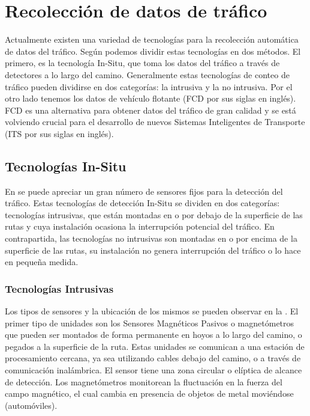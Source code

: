 \chapter{Recolección de datos de tráfico}
\label{cap:3}

Actualmente existen una variedad de tecnologías para la recolección automática de datos del tráfico. Según \cite{mimbela2003summary} podemos dividir estas tecnologías en dos métodos. El primero, es la tecnología In-Situ, que toma los datos del tráfico a través de detectores a lo largo del camino. Generalmente estas tecnologías de conteo de tráfico pueden dividirse en dos categorías: la intrusiva y la no intrusiva. Por el otro lado tenemos los datos de vehículo flotante (FCD por sus siglas en inglés). FCD es una alternativa para obtener datos del tráfico de gran calidad y se está volviendo crucial para el desarrollo de nuevos Sistemas Inteligentes de Transporte (ITS por sus siglas en inglés).

\section{Tecnologías In-Situ}

En \cite{klein2006traffic} se puede apreciar un gran número de sensores fijos para la detección del tráfico. Estas tecnologías de detección In-Situ se dividen en dos categorías: tecnologías intrusivas, que están montadas en o por debajo de la superficie de las rutas y cuya instalación ocasiona la interrupción potencial del tráfico. En contrapartida, las tecnologías no intrusivas son montadas en o por encima de la superficie de las rutas, su instalación no genera interrupción del tráfico o lo hace en pequeña medida. 

\subsection{Tecnologías Intrusivas}

Los tipos de sensores y la ubicación de los mismos se pueden observar en la . El primer tipo de unidades son los Sensores Magnéticos Pasivos o magnetómetros que pueden ser montados de forma permanente en hoyos a lo largo del camino, o pegados a la superficie de la ruta. Estas unidades se comunican a una estación de procesamiento cercana, ya sea utilizando cables debajo del camino, o a través de comunicación inalámbrica. El sensor tiene una zona circular o elíptica de alcance de detección. Los magnetómetros monitorean la fluctuación en la fuerza del campo magnético, el cual cambia en presencia de objetos de metal moviéndose (automóviles).


